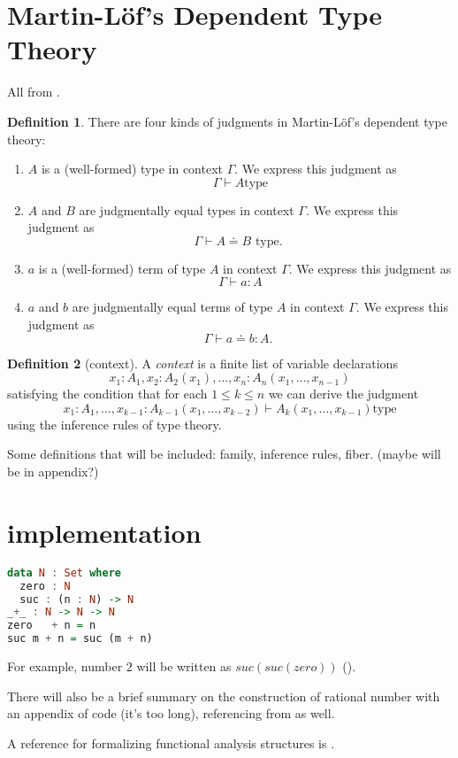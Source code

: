 \documentclass[a4paper]{article}
\theoremstyle{definition}
\newtheorem{definition}{Definition}
\begin{document}
\section{Martin-Löf’s Dependent Type Theory}
All from \citep{rijke_introduction_2021}.

\begin{definition}
	There are four kinds of judgments in Martin-Löf's dependent type theory: \begin{enumerate}

		\item $A$ is a (well-formed) type in context $\Gamma$. We express this judgment as
			\[\Gamma \vdash A \text{type} \]
		\item $A$ and $B$ are judgmentally equal types in context $\Gamma$. We express this judgment as
			\[\Gamma \vdash A \doteq B \text { type. }\]
		\item $a$ is a (well-formed) term of type $A$ in context $\Gamma$. We express this judgment as
			\[\Gamma \vdash a: A \]
		\item $a$ and $b$ are judgmentally equal terms of type $A$ in context $\Gamma$. We express this judgment as
\[\Gamma \vdash a \doteq b: A \text {. }\]
\end{enumerate}
\end{definition}

\begin{definition}[context]
	A \textit{context} is a finite list of variable declarations \[
	x_{1}: A_{1}, x_{2}: A_{2}\left(x_{1}\right), \ldots, x_{n}: A_{n}\left(x_{1}, \ldots, x_{n-1}\right)
	\] satisfying the condition that for each $1 \le k \le n$ we can derive the judgment \[
	x_{1}: A_{1}, \ldots, x_{k-1}: A_{k-1}\left(x_{1}, \ldots, x_{k-2}\right) \vdash A_{k}\left(x_{1}, \ldots, x_{k-1}\right)\text{type}
	\] using the inference rules of type theory.
\end{definition}

Some definitions that will be included: family, inference rules, fiber. (maybe will be in appendix?)

\section{implementation}

\begin{lstlisting}[language=Haskell]
data N : Set where
  zero : N
  suc : (n : N) -> N
_+_ : N -> N -> N
zero   + n = n
suc m + n = suc (m + n)
\end{lstlisting}

For example, number $2$ will be written as  $suc(suc(zero))$ (\citep{lundfall_formalizing_nodate}).

There will also be a brief summary on the construction of rational number with an appendix of code (it's too long), referencing from  \citep{lundfall_formalizing_nodate} as well.

A reference for formalizing functional analysis structures is  \citep{affeldt_formalizing_nodate}.


\newpage

\end{document}
